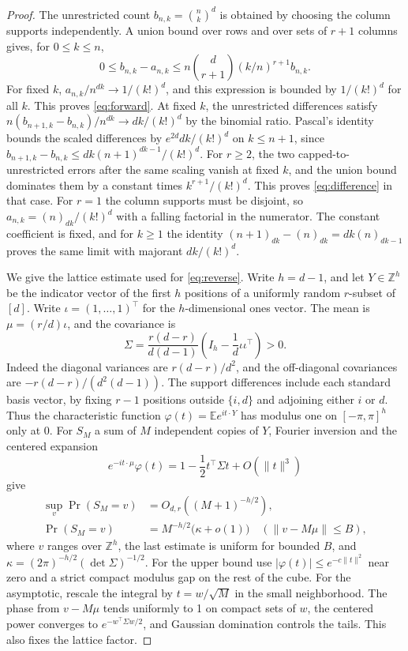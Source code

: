 \documentclass[11pt]{article}
\begin{document}
\begin{proof}
The unrestricted count \(b_{n,k}=\binom nk^d\) is obtained by choosing
the column supports independently. A union bound over rows and over
sets of \(r+1\) columns gives, for \(0\le k\le n\),
\[
0\le b_{n,k}-a_{n,k}
 \le n\binom d{r+1}(k/n)^{r+1} b_{n,k}.
\]
For fixed \(k\), \(a_{n,k}/n^{dk}\to1/(k!)^d\), and this expression is
bounded by \(1/(k!)^d\) for all \(k\). This proves \eqref{eq:forward}.
At fixed \(k\), the unrestricted differences satisfy
\(n(b_{n+1,k}-b_{n,k})/n^{dk}\to dk/(k!)^d\) by the binomial ratio.
Pascal's identity bounds the scaled differences by
\(e^{2d}dk/(k!)^d\) on \(k\le n+1\), since
\(b_{n+1,k}-b_{n,k}\le dk(n+1)^{dk-1}/(k!)^d\).
For \(r\ge2\), the two capped-to-unrestricted errors after the same
scaling vanish at fixed \(k\), and the union bound dominates them
by a constant times \(k^{r+1}/(k!)^d\). This proves
\eqref{eq:difference} in that case.
For \(r=1\) the column supports must be disjoint, so
\(a_{n,k}=(n)_{dk}/(k!)^d\) with a falling factorial in the numerator.
The constant coefficient is fixed, and for \(k\ge1\) the identity
\((n+1)_{dk}-(n)_{dk}=dk(n)_{dk-1}\) proves the same limit with
majorant \(dk/(k!)^d\).

We give the lattice estimate used for \eqref{eq:reverse}.
Write \(h=d-1\), and let \(Y\in\mathbb Z^h\) be the indicator vector
of the first \(h\) positions of a uniformly random \(r\)-subset of
\([d]\). Write \(\iota=(1,\ldots,1)^\top\) for the \(h\)-dimensional ones vector.
The mean is \(\mu=(r/d)\iota\), and the covariance is
\[
\Sigma=\frac{r(d-r)}{d(d-1)}
       \left(I_h-\frac1d\iota\iota^\top\right)>0.
\]
Indeed the diagonal variances are \(r(d-r)/d^2\), and the off-diagonal
covariances are \(-r(d-r)/(d^2(d-1))\). The support differences
include each standard basis vector, by fixing \(r-1\) positions
outside \(\{i,d\}\) and adjoining either \(i\) or \(d\).
Thus the characteristic function \(\varphi(t)=\mathbb E e^{it\cdot Y}\)
has modulus one on \([-\pi,\pi]^h\) only at \(0\).
For \(S_M\) a sum of \(M\) independent copies of \(Y\), Fourier
inversion and the centered expansion
\[
e^{-it\cdot\mu}\varphi(t)=1-\frac12 t^\top\Sigma t+O(\|t\|^3)
\]
give
\begin{align*}
\sup_v\Pr(S_M=v)&=O_{d,r}((M+1)^{-h/2}),\\
\Pr(S_M=v)&=M^{-h/2}\big(\kappa+o(1)\big)
   \quad(\|v-M\mu\|\le B),
\end{align*}
where \(v\) ranges over \(\mathbb Z^h\), the last estimate is
uniform for bounded \(B\), and
\(\kappa=(2\pi)^{-h/2}(\det\Sigma)^{-1/2}\).
For the upper bound use \(|\varphi(t)|\le e^{-c\|t\|^2}\)
near zero and a strict compact modulus gap on the rest of the
cube. For the asymptotic, rescale the integral by \(t=w/\sqrt M\)
in the small neighborhood. The phase from \(v-M\mu\) tends
uniformly to 1 on compact sets of \(w\), the centered power
converges to \(e^{-w^\top\Sigma w/2}\), and Gaussian domination
controls the tails. This also fixes the lattice factor.


\end{proof}
\end{document}
